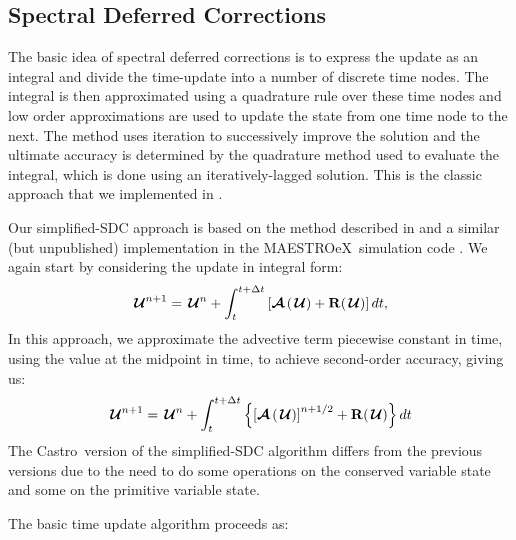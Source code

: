 \documentclass[times,preprint]{aastex63}
\newcommand{\castro}{{\sf Castro}}
\newcommand{\maestroex}{{\sf MAESTROeX}}
\newcommand{\Uc}{{\,\bm{\mathcal{U}}}}
\newcommand{\Rb}{{\bf R}}
\newcommand{\Adv}[1]{{\left [\boldsymbol{\mathcal{A}} \left(#1\right)\right]}}
\newcommand{\Advs}[1]{\boldsymbol{\mathcal{A}} \left(#1\right)}
\newcommand{\MarginPar}[1]{\marginpar{\vskip-\baselineskip\raggedright\tiny\sffamily\hrule\smallskip{\color{red}#1}\par\smallskip\hrule}}
\begin{document}
\subsection{Spectral Deferred Corrections}

The basic idea of spectral deferred corrections \MarginPar{ref} is to express the
update as an integral and divide the time-update into a number of
discrete time nodes.  The integral is then approximated using a
quadrature rule over these time nodes and low order approximations are
used to update the state from one time node to the next.  The method
uses iteration to successively improve the solution and the ultimate
accuracy is determined by the quadrature method used to evaluate the
integral, which is done using an iteratively-lagged solution.  This is the
classic approach that we implemented in \cite{castro_sdc}.

Our simplified-SDC approach is based on the method described in \citet{SDC-old} and
a similar (but unpublished) implementation in the \maestroex\ simulation code \cite{maestroex}.
We again start by considering the update
in integral form:
\begin{equation}
\Uc^{n+1} = \Uc^n + \int_t^{t+\Delta t} \left [ \Advs{\Uc} + \Rb(\Uc) \right ] dt,
\end{equation}
In this approach, we 
approximate the advective term
piecewise constant in time, using the value at the midpoint in time,
to achieve second-order accuracy, giving us:
\begin{equation}
\label{eq:integral:simplesdc}
\Uc^{n+1} = \Uc^n + \int_t^{t+\Delta t} \left \{ \Adv{\Uc}^{n+1/2} + \Rb(\Uc) \right \} dt
\end{equation}
The \castro\ version of the simplified-SDC algorithm
differs from the previous versions due to the need to do some operations
on the conserved variable state and some on the primitive variable
state. 

The basic time update algorithm proceeds as:
\end{document}
